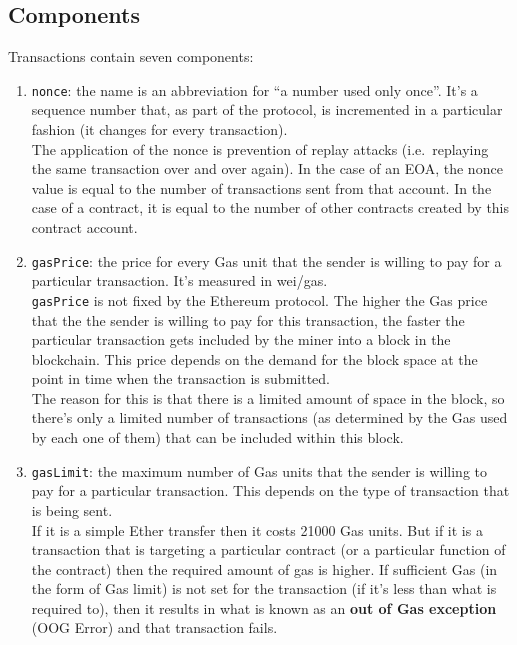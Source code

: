 \subsection{Components}\label{components}

Transactions contain seven components:

\begin{enumerate}
\def\labelenumi{\arabic{enumi}.}
\item
  \texttt{nonce}: the name is an abbreviation for ``a number used only
  once''. It's a sequence number that, as part of the protocol, is
  incremented in a particular fashion (it changes for every
  transaction).\\

  The application of the nonce is prevention of replay attacks
  (i.e.~replaying the same transaction over and over again). In the case
  of an EOA, the nonce value is equal to the number of transactions sent
  from that account. In the case of a contract, it is equal to the
  number of other contracts created by this contract account.
\item
  \texttt{gasPrice}: the price for every Gas unit that the sender is
  willing to pay for a particular transaction. It's measured in
  wei/gas.\\

  \texttt{gasPrice} is not fixed by the Ethereum protocol. The higher
  the Gas price that the the sender is willing to pay for this
  transaction, the faster the particular transaction gets included by
  the miner into a block in the blockchain. This price depends on the
  demand for the block space at the point in time when the transaction
  is submitted.\\

  The reason for this is that there is a limited amount of space in the
  block, so there's only a limited number of transactions (as determined
  by the Gas used by each one of them) that can be included within this
  block.
\item
  \texttt{gasLimit}: the maximum number of Gas units that the sender is
  willing to pay for a particular transaction. This depends on the type
  of transaction that is being sent.\\

  If it is a simple Ether transfer then it costs 21000 Gas units. But if
  it is a transaction that is targeting a particular contract (or a
  particular function of the contract) then the required amount of gas
  is higher. If sufficient Gas (in the form of Gas limit) is not set for
  the transaction (if it's less than what is required to), then it
  results in what is known as an \textbf{out of Gas exception} (OOG
  Error) and that transaction fails.\\


\end{enumerate}
